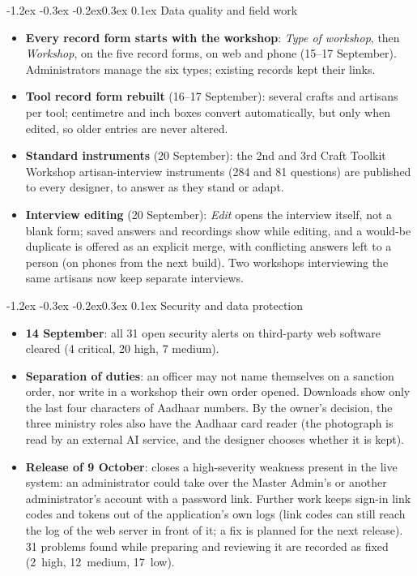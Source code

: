\documentclass[10pt,a4paper]{article}
\makeatletter
\renewcommand\section{\@startsection{section}{1}{\z@}%
  {-1.2ex \@plus -0.3ex \@minus -0.2ex}{0.3ex \@plus 0.1ex}%
  {\normalfont\large\bfseries\color{accent}}}
\makeatother
\begin{document}
\section{Data quality and field work}
\begin{itemize}
\item \textbf{Every record form starts with the workshop}: \emph{Type of workshop}, then \emph{Workshop}, on the
  five record forms, on web and phone (15--17 September). Administrators manage the six types; existing
  records kept their links.
\item \textbf{Tool record form rebuilt} (16--17 September): several crafts and artisans per tool; centimetre and inch
  boxes convert automatically, but only when edited, so older entries are never altered.
\item \textbf{Standard instruments} (20 September): the 2nd and 3rd Craft Toolkit Workshop artisan-interview
  instruments (284 and 81 questions) are published to every designer, to answer as they stand or adapt.
\item \textbf{Interview editing} (20 September): \emph{Edit} opens the interview itself, not a blank form; saved
  answers and recordings show while editing, and a would-be duplicate is offered as an explicit merge, with
  conflicting answers left to a person (on phones from the next build). Two workshops interviewing the same
  artisans now keep separate interviews.
\end{itemize}

\section{Security and data protection}
\begin{itemize}
\item \textbf{14 September}: all 31 open security alerts on third-party web software cleared (4 critical, 20 high, 7 medium).
\item \textbf{Separation of duties}: an officer may not name themselves on a sanction order, nor write in a
  workshop their own order opened. Downloads show only the last four characters of Aadhaar numbers. By the
  owner's decision, the three ministry roles also have the Aadhaar card reader (the photograph is read by an
  external AI service, and the designer chooses whether it is kept).
\item \textbf{Release of 9 October}: closes a high-severity weakness present in the live system: an administrator
  could take over the Master Admin's or another administrator's account with a password link. Further work
  keeps sign-in link codes and tokens out of the application's own logs (link codes can still reach the log
  of the web server in front of it; a fix is planned for the next release). 31 problems found while preparing
  and reviewing it are recorded as fixed (2~high, 12~medium, 17~low).
\end{itemize}
\end{document}
